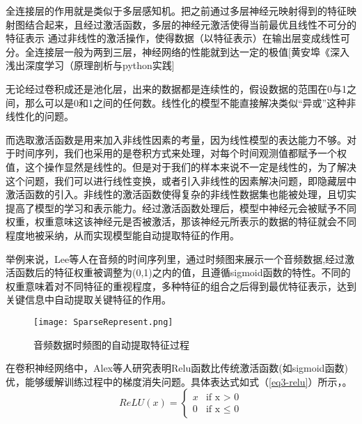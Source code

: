 全连接层的作用就是类似于多层感知机。把之前通过多层神经元映射得到的特征映射图结合起来，且经过激活函数，多层的神经元激活使得当前最优且线性不可分的特征表示 通过非线性的激活操作，使得数据（以特征表示）在输出层变成线性可分。全连接层一般为两到三层，神经网络的性能就到达一定的极值[黄安埠《深入浅出深度学习（原理剖析与python实践]

无论经过卷积成还是池化层，出来的数据都是连续性的，假设数据的范围在0与1之间，那么可以是0和1之间的任何数。线性化的模型不能直接解决类似“异或”这种非线性化的问题。
    
而选取激活函数是用来加入非线性因素的考量，因为线性模型的表达能力不够。对于时间序列，我们也采用的是卷积方式来处理，对每个时间观测值都赋予一个权值，这个操作显然是线性的。但是对于我们的样本来说不一定是线性的，为了解决这个问题，我们可以进行线性变换，或者引入非线性的因素解决问题，即隐藏层中激活函数的引入。非线性的激活函数使得复杂的非线性数据集也能被处理，且切实提高了模型的学习和表示能力。经过激活函数处理后，模型中神经元会被赋予不同权重，权重意味这该神经元是否被激活，那该神经元所表示的数据的特征就会不同程度地被采纳，从而实现模型能自动提取特征的作用。

举例来说，Lee等人在音频的时间序列里，通过时频图来展示一个音频数据,经过激活函数后的特征权重被调整为(0,1)之内的值，且遵循sigmoid函数的特性。不同的权重意味着对不同特征的重视程度，多种特征的组合之后得到最优特征表示，达到关键信息中自动提取关键特征的作用。
\begin{figure}[htb]
 \centering
 \texttt{[image: SparseRepresent.png]}
    \caption{\label{fig:SR}音频数据时频图的自动提取特征过程}
\end{figure}



在卷积神经网络中，Alex等人\cite{krizhevsky2012imagenet}研究表明Relu函数比传统激活函数(如sigmoid函数)优，能够缓解训练过程中的梯度消失问题。具体表达式如式（\ref{eq3-relu}）所示，。
\begin{equation}
ReLU(x)=
\begin{cases}
x& \text{if\ x $>$ 0}\\
0& \text{if x $\leq$ 0}
\end{cases}
\label{eq3-relu}
\end{equation}


